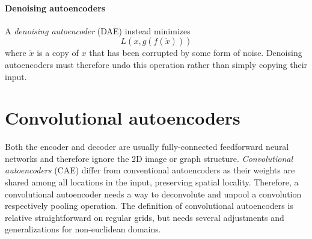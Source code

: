 \documentclass[pdftex,10pt,a4paper]{scrartcl}
\begin{document}
\paragraph{Denoising autoencoders}

A \emph{denoising autoencoder} (DAE) instead minimizes
\begin{equation*}
  L(x, g(f(\tilde{x})))
\end{equation*}
where $\tilde{x}$ is a copy of $x$ that has been corrupted by some form of noise.
Denoising autoencoders must therefore undo this operation rather than simply copying their input.

\section{Convolutional autoencoders}

Both the encoder and decoder are usually fully-connected feedforward neural networks and therefore ignore the 2D image or graph structure.
\emph{Convolutional autoencoders} (CAE) differ from conventional autoencoders as their weights are shared among all locations in the input, preserving spatial locality.
Therefore, a convolutional autoencoder needs a way to deconvolute and unpool a convolution respectively pooling operation.
The definition of convolutional autoencoders is relative straightforward on regular grids, but needs several adjustments and generalizations for non-euclidean domains.
\end{document}
